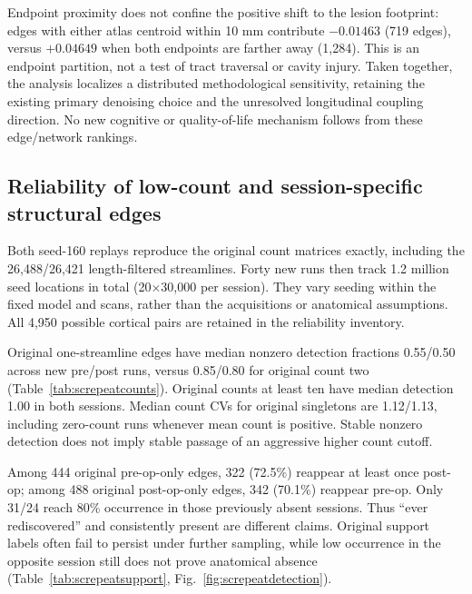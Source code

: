 \documentclass[11pt,a4paper]{article}
\begin{document}
Endpoint proximity does not confine the positive shift to the lesion footprint: edges with either atlas centroid within 10 mm contribute $-0.01463$ (719 edges), versus $+0.04649$ when both endpoints are farther away (1,284). This is an endpoint partition, not a test of tract traversal or cavity injury. Taken together, the analysis localizes a distributed methodological sensitivity, retaining the existing primary denoising choice and the unresolved longitudinal coupling direction. No new cognitive or quality-of-life mechanism follows from these edge/network rankings.

\subsection{Reliability of low-count and session-specific structural edges}\label{sec:screliabilityresults}
Both seed-160 replays reproduce the original count matrices exactly, including the 26,488/26,421 length-filtered streamlines. Forty new runs then track 1.2 million seed locations in total (20$\times$30,000 per session). They vary seeding within the fixed model and scans, rather than the acquisitions or anatomical assumptions. All 4,950 possible cortical pairs are retained in the reliability inventory.

Original one-streamline edges have median nonzero detection fractions 0.55/0.50 across new pre/post runs, versus 0.85/0.80 for original count two (Table~\ref{tab:screpeatcounts}). Original counts at least ten have median detection 1.00 in both sessions. Median count CVs for original singletons are 1.12/1.13, including zero-count runs whenever mean count is positive. Stable nonzero detection does not imply stable passage of an aggressive higher count cutoff.

\begin{table}[H]\centering\small
\caption{Conditional seed stability by original count. Occurrence means nonzero count in 20 new runs; CV is SD/mean count, including zeros but omitting undefined all-zero CVs. These are edge-distribution summaries, not uncertainty intervals for true anatomical connectivity.}\label{tab:screpeatcounts}\end{table}

Among 444 original pre-op-only edges, 322 (72.5\%) reappear at least once post-op; among 488 original post-op-only edges, 342 (70.1\%) reappear pre-op. Only 31/24 reach 80\% occurrence in those previously absent sessions. Thus ``ever rediscovered'' and consistently present are different claims. Original support labels often fail to persist under further sampling, while low occurrence in the opposite session still does not prove anatomical absence (Table~\ref{tab:screpeatsupport}, Fig.~\ref{fig:screpeatdetection}).
\end{document}
